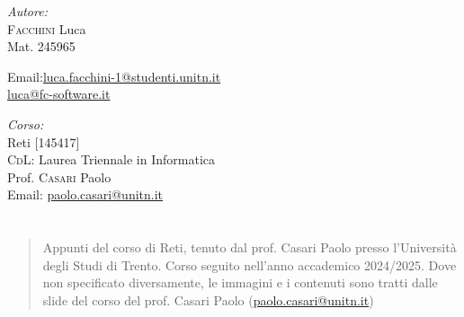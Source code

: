 \documentclass[twoside]{report}
\makeatletter
\renewenvironment{abstract}{%
    \if@twocolumn
        \section*{\abstractname}%
    \else
        \begin{center}%
            {\bfseries \abstractname\vspace{-.5em}\vspace{\z@}}%
        \end{center}%
        \small
        \begin{quotation}
    \fi}
    {\if@twocolumn\else\end{quotation}\fi}
\makeatother
\begin{document}
\begin{titlepage}
        \vfill
        \begin{minipage}[t]{0.4\textwidth}
            \begin{flushleft} \normalsize
                \emph{Autore:}\\
                \textsc{Facchini} Luca \\ %
                Mat. 245965 \\
                \vspace{-\baselineskip}
                \begin{tabbing}
                    Email:\= \href{mailto:luca.facchini-1@studenti.unitn.it}{luca.facchini-1@studenti.unitn.it} \\
                        \>  \href{mailto:luca@fc-software.it}{luca@fc-software.it}
                \end{tabbing}
            \end{flushleft}
        \end{minipage}%
        \hfill
        \begin{minipage}[t]{0.4\textwidth}
            \begin{flushleft} \normalsize
                \emph{Corso:}\\
                Reti [145417] \\
                \textsc{CdL}: Laurea Triennale in Informatica \\
                Prof. \textsc{Casari} Paolo \\
                Email: \href{mailto:paolo.casari@unitn.it}{paolo.casari@unitn.it}
            \end{flushleft}
        \end{minipage}
        \vfill
        \begin{abstract}
            Appunti del corso di Reti, tenuto dal prof. Casari Paolo presso l'Università degli Studi di Trento. Corso seguito nell'anno accademico 2024/2025.\newline
            Dove non specificato diversamente, le immagini e i contenuti sono tratti dalle slide del corso del prof. Casari Paolo (\href{mailto:paolo.casari@unitn.it}{paolo.casari@unitn.it})
        \end{abstract}
        
    \end{titlepage}
    \begingroup
        \pagestyle{tocStyle}
        \tableofcontents
    \endgroup
    \pagestyle{stdPage}
    
\end{document}
